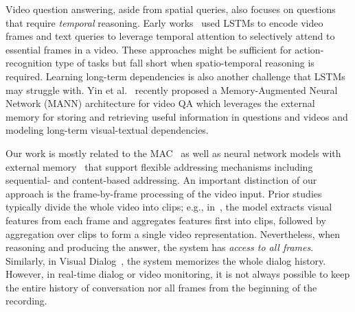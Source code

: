 Video question answering, aside from spatial queries, also focuses on questions that require \emph{temporal} reasoning. Early works~\cite{mun2017marioqa, xu2017video, yu2017end} used LSTMs to encode video frames and text queries to leverage temporal attention to selectively attend to essential frames in a video. These approaches might be sufficient for action-recognition type of tasks but fall short when spatio-temporal reasoning is required. Learning long-term dependencies is also another challenge that LSTMs may struggle with. Yin et al.~\cite{yin2019memory} recently proposed a Memory-Augmented Neural Network (MANN) architecture for video QA which leverages the external memory for storing and retrieving useful information in questions and videos and modeling long-term visual-textual dependencies.

Our work is mostly related to the MAC~\cite{hudson2018compositional} as well as neural network models with
external memory~\cite{graves2014neural, graves2016hybrid} that support flexible addressing mechanisms 
including sequential- and content-based addressing. 
An important distinction of our approach is the frame-by-frame processing of the video input. Prior studies typically divide the whole video into clips; e.g., in~\cite{song2018explore}, the model extracts visual features from each frame and aggregates features first into clips, followed by aggregation over clips to form a single video representation. Nevertheless, when reasoning and producing the answer, the system has \emph{access to all frames}. Similarly, in Visual Dialog~\cite{das2017visual}, the system memorizes the whole dialog history. However, in real-time dialog or video monitoring, it is not always possible to keep the entire history of conversation nor all frames from the beginning of the recording.
